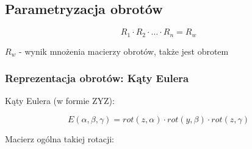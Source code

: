 \documentclass{article}
\begin{document}
\newpage

\subsection{Parametryzacja obrotów}

\Large
$$
    R_{1}\cdot R_{2} \cdot \ldots \cdot R_{n} = R_{w}
$$
\normalsize

$R_{w}$ - wynik mnożenia macierzy obrotów, także jest obrotem

\subsubsection{Reprezentacja obrotów: Kąty Eulera}

Kąty Eulera (w formie ZYZ):

\Large
$$
    E\left(\alpha, \beta, \gamma\right)=rot\left(z, \alpha\right) \cdot rot\left(y, \beta\right) \cdot rot\left(z, \gamma\right)
$$
\normalsize

Macierz ogólna takiej rotacji:
\end{document}
